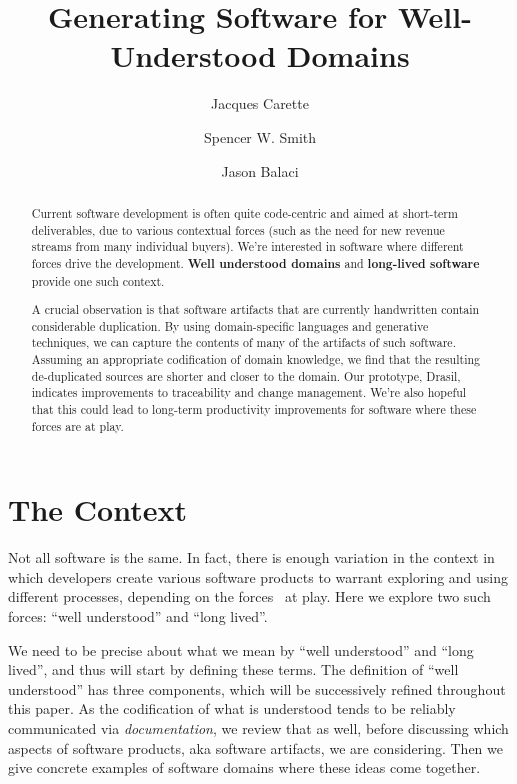 \documentclass[a4paper,UKenglish,cleveref,autoref,thm-restate]{oasics-v2021}
\title{Generating Software for Well-Understood Domains}
\author{Jacques Carette}{Department of Computing and Software, McMaster University, 1280 Main Street West, Hamilton, Ontario, L8S 4L8, Canada \and \url{https://www.cas.mcmaster.ca/~carette/} }{carette@mcmaster.ca}{https://orcid.org/0000-0001-8993-9804}{}
\author{Spencer W. Smith}{Department of Computing and Software, McMaster University, 1280 Main Street West, Hamilton, Ontario, L8S 4L8, Canada \and \url{https://www.cas.mcmaster.ca/~smiths/} }{smiths@mcmaster.ca}{https://orcid.org/0000-0002-0760-0987}{}
\author{Jason Balaci}{Department of Computing and Software, McMaster University, 1280 Main Street West, Hamilton, Ontario, L8S 4L8, Canada}{balacij@mcmaster.ca}{}{}
\begin{document}
\maketitle

\begin{abstract}
    Current software development is often quite code-centric and aimed at
    short-term deliverables, due to various contextual forces (such as the
    need for new revenue streams from many individual buyers). We're interested
    in software where different forces drive the development. \textbf{Well
    understood domains} and \textbf{long-lived software} provide one such
    context.

    A crucial observation is that software artifacts that are currently
    handwritten contain considerable duplication.  By using domain-specific
    languages and generative techniques, we can capture the contents of many of
    the artifacts of such software.  Assuming an appropriate codification of
    domain knowledge, we find that the resulting de-duplicated sources are
    shorter and closer to the domain.  Our prototype, Drasil, indicates
    improvements to traceability and change management. We're also hopeful
    that this could lead to long-term productivity improvements for software
    where these forces are at play.
\end{abstract}

\section{The Context}
\label{sec:the-context}

Not all software is the same. In fact, there is enough variation in the
context in which developers create various software products to warrant exploring and
using different processes, depending on the forces~\cite{alexander1977pattern}
at play. Here we explore two such forces: ``well understood'' and ``long
lived''.

We need to be precise about what we mean by ``well understood'' and ``long lived'',
and thus will start by defining these terms. The definition of ``well understood''
has three components, which will be successively refined throughout this paper.
As the codification of what is understood tends to be reliably communicated via
\emph{documentation}, we review that as well, before discussing which aspects of
software products, aka software artifacts, we are considering. Then we give
concrete examples of software domains where these ideas come together.
\end{document}
